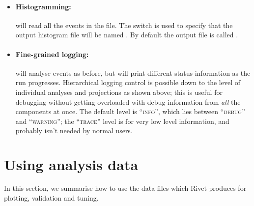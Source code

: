 \documentclass{JHEP3}
\begin{document}
\begin{itemize}

\item \paragraph{Histogramming:}{ will read all the
    events in the  file. The  switch is used to
    specify that the output histogram file will be named . By
    default the output file is called .}

\item \paragraph{Fine-grained logging:}{
    will analyse events as before, but will print different status
    information as the run progresses. Hierarchical logging control is possible
    down to the level of individual analyses and projections as shown above;
    this is useful for debugging without getting overloaded with debug
    information from \emph{all} the components at once. The default level is
    ``\textsc{info}'', which lies between ``\textsc{debug}'' and
    ``\textsc{warning}''; the ``\textsc{trace}'' level is for very low level
    information, and probably isn't needed by normal users.}

\end{itemize}



\section{Using analysis data}

In this section, we summarise how to use the data files which Rivet produces for
plotting, validation and tuning.
\end{document}
